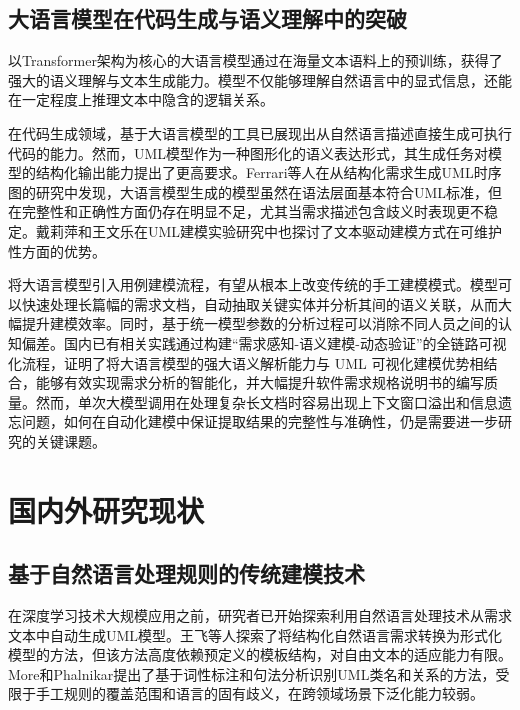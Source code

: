 \subsection{大语言模型在代码生成与语义理解中的突破}

以Transformer架构为核心的大语言模型通过在海量文本语料上的预训练，获得了强大的语义理解与文本生成能力\cite{vaswani2017attention}。模型不仅能够理解自然语言中的显式信息，还能在一定程度上推理文本中隐含的逻辑关系。

在代码生成领域，基于大语言模型的工具已展现出从自然语言描述直接生成可执行代码的能力。然而，UML模型作为一种图形化的语义表达形式，其生成任务对模型的结构化输出能力提出了更高要求。Ferrari等人\cite{ferrari2024model}在从结构化需求生成UML时序图的研究中发现，大语言模型生成的模型虽然在语法层面基本符合UML标准，但在完整性和正确性方面仍存在明显不足，尤其当需求描述包含歧义时表现更不稳定。戴莉萍和王文乐在UML建模实验研究中也探讨了文本驱动建模方式在可维护性方面的优势\cite{dailiping2021}。

将大语言模型引入用例建模流程，有望从根本上改变传统的手工建模模式。模型可以快速处理长篇幅的需求文档，自动抽取关键实体并分析其间的语义关联，从而大幅提升建模效率。同时，基于统一模型参数的分析过程可以消除不同人员之间的认知偏差。国内已有相关实践通过构建“需求感知-语义建模-动态验证”的全链路可视化流程，证明了将大语言模型的强大语义解析能力与 UML 可视化建模优势相结合，能够有效实现需求分析的智能化，并大幅提升软件需求规格说明书的编写质量\cite{yang2025software,zhang2023survey}。然而，单次大模型调用在处理复杂长文档时容易出现上下文窗口溢出和信息遗忘问题，如何在自动化建模中保证提取结果的完整性与准确性，仍是需要进一步研究的关键课题\cite{giannouris2025nomad}。

\section{国内外研究现状}

\subsection{基于自然语言处理规则的传统建模技术}

在深度学习技术大规模应用之前，研究者已开始探索利用自然语言处理技术从需求文本中自动生成UML模型。王飞等人\cite{wangfei2018}探索了将结构化自然语言需求转换为形式化模型的方法，但该方法高度依赖预定义的模板结构，对自由文本的适应能力有限。More和Phalnikar\cite{more2012generating}提出了基于词性标注和句法分析识别UML类名和关系的方法，受限于手工规则的覆盖范围和语言的固有歧义，在跨领域场景下泛化能力较弱。

